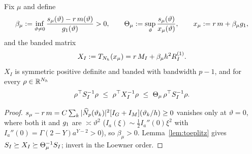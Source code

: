 \begin{theorem}\label{thm:comparison}
Fix $\mu$ and define
\[
 \beta_\mu:=\inf_{\vartheta\ne0}\frac{s_\mu(\vartheta)-r\,m(\vartheta)}{g_1(\vartheta)}>0,
 \qquad
 \Theta_\mu:=\sup_\vartheta\frac{s_\mu(\vartheta)}{x_\mu(\vartheta)},
 \qquad
 x_\mu:=r\,m+\beta_\mu g_1,
\]
and the banded matrix
\[
 X_I:=T_{N_h}(x_\mu)=r\,M_I+\beta_\mu h^2R^{(1)}_I.
\]
$X_I$ is symmetric positive definite and banded with bandwidth $p-1$, and
for every $\rho\in\mathbb{R}^{N_h}$
\begin{equation}
 \rho^\top S_I^{-1}\rho\ \le\ \rho^\top X_I^{-1}\rho\ \le\ \Theta_\mu\,\rho^\top S_I^{-1}\rho .
 \label{eq:comparison}
\end{equation}
\end{theorem}
\begin{proof}
$s_\mu-r\,m=C\sum_k|\widehat N_p(\vartheta_k)|^2[I_G+I_M](\vartheta_k/h)\ge0$ vanishes
only at $\vartheta=0$, where both it and $g_1$ are $\asymp\vartheta^2$
($I_a(\xi)\sim\tfrac12 I_a''(0)\xi^2$ with $I_a''(0)=\Gamma(2-Y)a^{Y-2}>0$), so
$\beta_\mu>0$.  Lemma~\ref{lem:toeplitz} gives $S_I\succeq X_I\succeq\Theta_\mu^{-1}S_I$;
invert in the Loewner order.
\end{proof}
